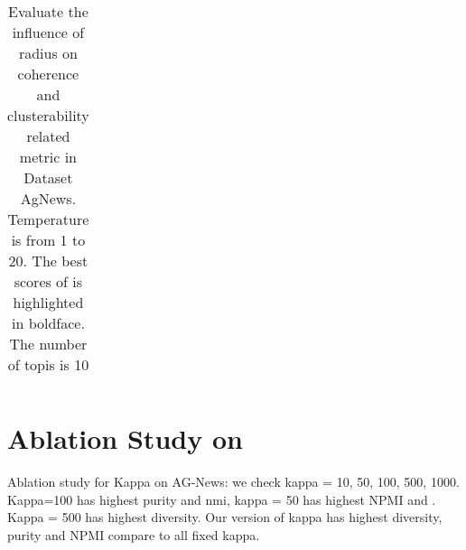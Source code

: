 \documentclass[11pt]{article}
\begin{document}
\begin{table}
\begin{tabular}{|r|r|r|r|r|r|r|}
\end{tabular}
\caption{\label{temperature} Evaluate the influence of radius on coherence and clusterability related metric in Dataset AgNews. Temperature is from 1 to 20.  The best scores of is highlighted in boldface. The number of topis is 10}

\end{table}

\section{Ablation Study on }
\label{kappas}

Ablation study for Kappa on AG-News: we check kappa = 10, 50, 100, 500, 1000. Kappa=100 has highest purity and nmi, kappa = 50 has highest NPMI and . Kappa = 500 has highest diversity. Our version of kappa has highest diversity, purity and NPMI compare to all fixed kappa. 
\end{document}
